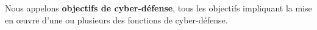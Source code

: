 \documentclass[conference]{IEEEtran}
\newcommand{\old}[1]{\textcolor{orange}{#1}}
\begin{document}


Nous appelons \textbf{objectifs de cyber-défense}, tous les objectifs impliquant la mise en œuvre d'une ou plusieurs des %
fonctions de cyber-défense.



\end{document}
